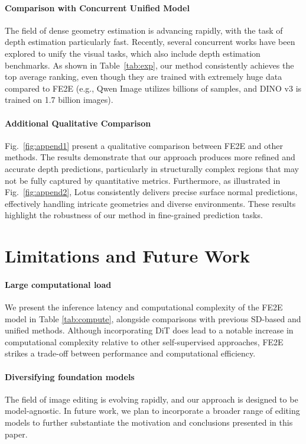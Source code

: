 \documentclass{article} %
\begin{document}
\paragraph{Comparison with Concurrent Unified Model}
The field of dense geometry estimation is advancing rapidly, with the task of depth estimation particularly fast. Recently, several concurrent works have been explored to unify the visual tasks, which also include depth estimation benchmarks. As shown in Table~\ref{tab:exp}, our method consistently achieves the top average ranking, even though they are trained with extremely huge data compared to FE2E (e.g., Qwen Image utilizes billions of samples, and DINO v3 is trained on 1.7 billion images).

\paragraph{Additional Qualitative Comparison}
Fig.~\ref{fig:append1} present a qualitative comparison between FE2E and other methods. The results demonstrate that our approach produces more refined and accurate depth predictions, particularly in structurally complex regions that may not be fully captured by quantitative metrics. Furthermore, as illustrated in Fig.~\ref{fig:append2}, Lotus consistently delivers precise surface normal predictions, effectively handling intricate geometries and diverse environments. These results highlight the robustness of our method in fine-grained prediction tasks.

\section{Limitations and Future Work}
\label{supp:future}
\paragraph{Large computational load}

We present the inference latency and computational complexity of the FE2E model in Table \ref{tab:compute}, alongside comparisons with previous SD-based and unified methods. Although incorporating DiT does lead to a notable increase in computational complexity relative to other self-supervised approaches, FE2E strikes a trade-off between performance and computational efficiency.
\paragraph{Diversifying foundation models} The field of image editing is evolving rapidly, and our approach is designed to be model-agnostic. In future work, we plan to incorporate a broader range of editing models to further substantiate the motivation and conclusions presented in this paper.
\end{document}
